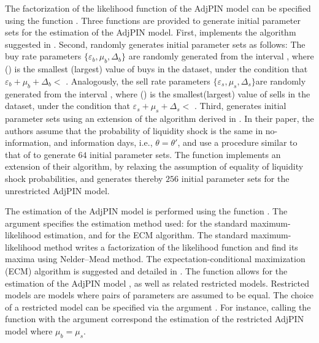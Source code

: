 The factorization of the likelihood function of the AdjPIN model can be specified using the function . Three functions are provided to generate initial parameter sets for the estimation of the AdjPIN model. First,  implements the algorithm suggested in \cite{Ersan2022methodological}. Second,  randomly generates initial parameter sets as follows: The buy rate parameters \( \{ \varepsilon_{b}, \mu_{b}, \Delta_{b}\}\) are randomly generated from the interval , where  () is the smallest (largest) value of buys in the dataset, under the condition that \(\varepsilon_{b}+\mu_{b}+\Delta_{b}<\) . Analogously, the sell rate parameters \( \{\varepsilon_{s}, \mu_{s}, \Delta_{s}\} \)are randomly generated from the interval , where  () is the smallest(largest) value of sells in the dataset, under the condition that \( \varepsilon_{s}+\mu_{s}+\Delta_{s}< \) . Third,  generates initial parameter sets using an extension of the algorithm derived in  \cite{cheng2021improvements}. In their paper, the authors assume that the probability of liquidity shock is the same in no-information, and information days, i.e., \(\theta  = \theta'\), and use a procedure similar to that of  \cite{Yan2012improved} to generate \(64\) initial parameter sets. The function implements an extension of their algorithm, by relaxing the assumption of equality of liquidity shock probabilities, and generates thereby \(256\) initial parameter sets for the unrestricted AdjPIN model.

The estimation of the AdjPIN model is performed using the function . The argument  specifies the estimation method used:  for the standard maximum-likelihood estimation, and   for the ECM algorithm. The standard maximum-likelihood method writes a factorization of the likelihood function and find its maxima using Nelder–Mead method. The expectation-conditional maximization (ECM) algorithm is suggested and detailed in  \cite{ghachem2022maximum}. The function allows for the estimation of the AdjPIN model \citep{duarte2009why}, as well as related restricted models. Restricted models are models where pairs of parameters are assumed to be equal. The choice of a restricted model can be specified via the argument . For instance, calling the function  with the argument  correspond the estimation of the restricted AdjPIN model where $\mu_b = \mu_s$.

